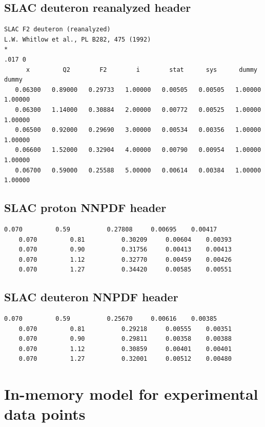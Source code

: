 \documentclass[12pt,a4paper]{report}
\begin{document}
\subsection{SLAC deuteron \cite{Whitlow} reanalyzed header}

\begin{Verbatim}[fontsize=\small]
SLAC F2 deuteron (reanalyzed)
L.W. Whitlow et al., PL B282, 475 (1992)
*
.017 0
      x         Q2        F2        i        stat      sys      dummy     dummy
   0.06300   0.89000   0.29733   1.00000   0.00505   0.00505   1.00000   1.00000
   0.06300   1.14000   0.30884   2.00000   0.00772   0.00525   1.00000   1.00000
   0.06500   0.92000   0.29690   3.00000   0.00534   0.00356   1.00000   1.00000
   0.06600   1.52000   0.32904   4.00000   0.00790   0.00954   1.00000   1.00000
   0.06700   0.59000   0.25588   5.00000   0.00614   0.00384   1.00000   1.00000
\end{Verbatim}

\subsection{SLAC proton NNPDF header}

\begin{Verbatim}[fontsize=\small]
    0.070         0.59          0.27808     0.00695    0.00417  
    0.070         0.81          0.30209     0.00604    0.00393  
    0.070         0.90          0.31756     0.00413    0.00413  
    0.070         1.12          0.32770     0.00459    0.00426  
    0.070         1.27          0.34420     0.00585    0.00551  
\end{Verbatim}

\subsection{SLAC deuteron NNPDF header}

\begin{Verbatim}[fontsize=\small]
    0.070         0.59          0.25670     0.00616    0.00385   
    0.070         0.81          0.29218     0.00555    0.00351   
    0.070         0.90          0.29811     0.00358    0.00388   
    0.070         1.12          0.30859     0.00401    0.00401   
    0.070         1.27          0.32001     0.00512    0.00480   
\end{Verbatim}

\section{In-memory model for experimental data points} \label{code:DataNode}
\end{document}

